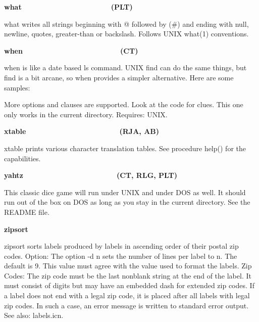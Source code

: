 {{\sffamily\bfseries
what\ \ \ \ \ \ \ \ \ \ \ \ \ \ \ \ \ \ \ \ \ \  (PLT)}

\textsf{what} writes all strings beginning with
{\textquotedbl}@{\textquotedbl} followed by
{\textquotedbl}(\#){\textquotedbl} and ending with null, newline,
quotes, greater-than or backslash. Follows UNIX \textsf{what(1)}
conventions.

{\sffamily\bfseries
when\ \ \ \ \ \ \ \ \ \ \ \ \ \ \ \ \ \ \ \ \ \  \ \ (CT)}

\textsf{when} is like a date based \textsf{ls} command. UNIX
\textsf{find} can do the same things, but \textsf{find} is a bit
arcane, so \textsf{when} provides a simpler alternative. Here are some
samples:





More options and clauses are supported. Look at the code for clues. This
one only works in the current directory. Requires: UNIX.

{\sffamily\bfseries
xtable\ \ \ \ \ \ \ \ \ \ \ \ \ \ \ \ \ \ \ \  \ \ \ (RJA, AB)}

\textsf{xtable} prints various character translation tables. See
procedure \textsf{help()} for the capabilities.

{\sffamily\bfseries
yahtz\ \ \ \ \ \ \ \ \ \ \ \ \ \ \ \ \ \  \ \ \ \ \ (CT, RLG, PLT)}

This classic dice game will run under UNIX and under DOS as well. It
should run out of the box on DOS as long as you stay in the current
directory. See the README file.

{\sffamily\bfseries
zipsort\ \ \ \ \ \ \ \ \ \ \ \ \ \ \ \ \ \ \ \ }

\textsf{zipsort} sorts labels produced by labels in ascending order of
their postal zip codes. Option: The option \textsf{{}-d n} sets the
number of lines per label to n. The default is 9. This value must agree
with the value used to format the labels. Zip Codes: The zip code must
be the last nonblank string at the end of the label. It must consist of
digits but may have an embedded dash for extended zip codes. If a label
does not end with a legal zip code, it is placed after all labels with
legal zip codes. In such a case, an error message is written to
standard error output. See also: \textsf{labels.icn}.

}
